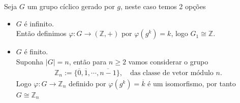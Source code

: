 Seja $G$ um grupo cíclico gerado por $g$, neste caso temos 2 opções
\begin{itemize}
  \item $G$ é infinito.\\
    Então definimos $\varphi:G\to(\mathbb{Z},+)$ por $\varphi(g^{k})=k$, logo $G_1\cong \mathbb{Z}$.
  \item $G$ é finito.\\
    Suponha $|G|=n$, então para $n\geq 2$ vamos considerar o grupo
    \begin{align*}
      \mathbb{Z}_{n}:=\{\overline{0},\overline{1},\cdots,\overline{n-1}\},\quad\text{das classe de vetor módulo $n$.}
    \end{align*}
    Logo $\varphi:G\to\mathbb{Z}_{n}$ definido por $\varphi(g^{k})=\overline{k}$ é um isomorfismo, por tanto $G\cong \mathbb{Z}_{n}$ 
\end{itemize}
